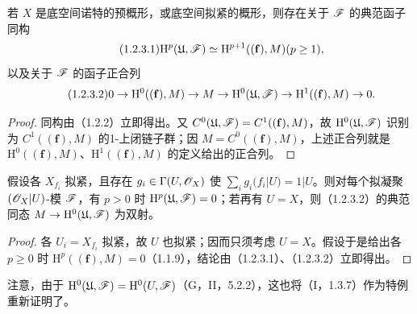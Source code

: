 若 $X$ 是底空间诺特的预概形，或底空间拟紧的概形，则存在关于 $\mathscr F$ 的典范函子同构
\begin{equation}\tag{1.2.3.1}
\mathrm H^p(\mathfrak U,\mathscr F)\simeq\mathrm H^{p+1}((\mathbf f),M)(p\geq1),
\end{equation}
以及关于 $\mathscr F$ 的函子正合列
\begin{equation}\tag{1.2.3.2}
0\to\mathrm H^0((\mathbf f),M)\to M\to\mathrm H^0(\mathfrak U,\mathscr F)
\to\mathrm H^1((\mathbf f),M)\to0.
\end{equation}
\begin{proof}
同构由（1.2.2）立即得出。又 $C^0(\mathfrak U,\mathscr F)=C^1((\mathbf f),M)$，故 $\mathrm H^0(\mathfrak U,\mathscr F)$ 识别为 $C^1((\mathbf f),M)$ 的1-上闭链子群；因 $M=C^0((\mathbf f),M)$，上述正合列就是 $\mathrm H^0((\mathbf f),M)$、$\mathrm H^1((\mathbf f),M)$ 的定义给出的正合列。
\end{proof}

假设各 $X_{f_i}$ 拟紧，且存在 $g_i\in\Gamma(U,\mathscr O_X)$ 使 $\sum_ig_i(f_i|U)=1|U$。则对每个拟凝聚 $(\mathscr O_X|U)$-模 $\mathscr F$，有 $p>0$ 时 $\mathrm H^p(\mathfrak U,\mathscr F)=0$；若再有 $U=X$，则（1.2.3.2）的典范同态 $M\to\mathrm H^0(\mathfrak U,\mathscr F)$ 为双射。
\begin{proof}
各 $U_i=X_{f_i}$ 拟紧，故 $U$ 也拟紧；因而只须考虑 $U=X$。假设于是给出各 $p\geq0$ 时 $\mathrm H^p((\mathbf f),M)=0$（1.1.9），结论由（1.2.3.1）、（1.2.3.2）立即得出。
\end{proof}
注意，由于 $\mathrm H^0(\mathfrak U,\mathscr F)=\mathrm H^0(U,\mathscr F)$（G，II，5.2.2），这也将（I，1.3.7）作为特例重新证明了。


